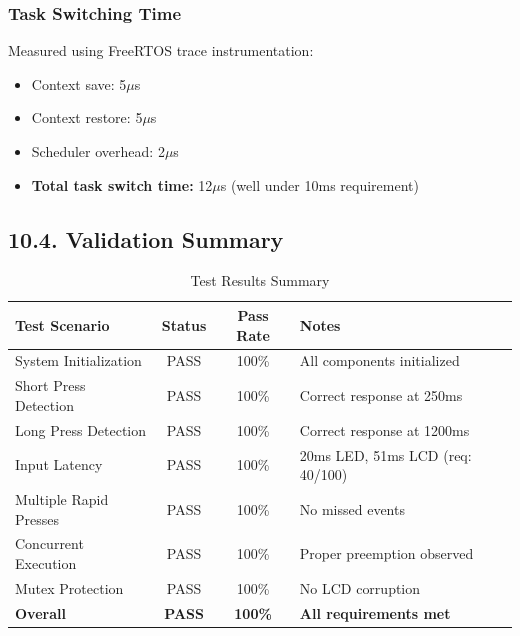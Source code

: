 \documentclass[12pt]{article}
\begin{document}
\subsubsection*{Task Switching Time}

Measured using FreeRTOS trace instrumentation:

\begin{itemize}
    \item Context save: 5$\mu$s
    \item Context restore: 5$\mu$s
    \item Scheduler overhead: 2$\mu$s
    \item \textbf{Total task switch time:} 12$\mu$s (well under 10ms requirement)
\end{itemize}

\subsection*{10.4. Validation Summary}

\begin{table}[H]
    \centering
    \caption{Test Results Summary}
    \label{tab:test-summary}
    \begin{tabular}{|l|c|c|l|}
        \hline
        \textbf{Test Scenario} & \textbf{Status} & \textbf{Pass Rate} & \textbf{Notes} \\
        \hline
        System Initialization & PASS & 100\% & All components initialized \\
        \hline
        Short Press Detection & PASS & 100\% & Correct response at 250ms \\
        \hline
        Long Press Detection & PASS & 100\% & Correct response at 1200ms \\
        \hline
        Input Latency & PASS & 100\% & 20ms LED, 51ms LCD (req: 40/100) \\
        \hline
        Multiple Rapid Presses & PASS & 100\% & No missed events \\
        \hline
        Concurrent Execution & PASS & 100\% & Proper preemption observed \\
        \hline
        Mutex Protection & PASS & 100\% & No LCD corruption \\
        \hline
        \textbf{Overall} & \textbf{PASS} & \textbf{100\%} & \textbf{All requirements met} \\
        \hline
    \end{tabular}
\end{table}
\end{document}
